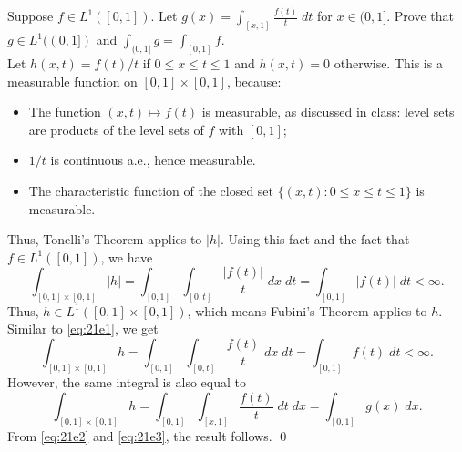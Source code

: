 \begin{hwsol}
Suppose $f \in L^1([0, 1])$. Let $g(x)= \int_{[x, 1]} \frac{f(t)}{t} \;dt$ for $x \in (0,1]$. Prove that $g \in L^1((0, 1])$ and $\int_{(0, 1]} g= \int_{[0, 1]} f$. \\

\pf Let $h(x,t)= f(t)/t$ if $0 \leq x \leq t \leq 1$ and $h(x,t)=0$ otherwise. This is a measurable function on $[0,1] \times [0,1]$, because: 
        \begin{itemize}
        \item The function $(x,t) \mapsto f(t)$ is measurable, as discussed in class: level sets are products of the level sets of $f$ with $[0,1]$;   
        \item $1/t$ is continuous a.e., hence measurable.
        \item The characteristic function of the closed set $\{ (x,t) \colon 0 \leq x \leq t \leq 1 \}$ is measurable.  
        \end{itemize}
Thus, Tonelli's Theorem applies to $|h|$. Using this fact and the fact that $f \in L^1([0,1])$, we have
        \begin{equation} \label{eq:21e1}
        \int_{[0, 1]\times [0, 1]} |h|= \int_{[0, 1]} \int_{[0, t]} \frac{|f(t)|}{t} \;dx \;dt = \int_{[0, 1]} |f(t)|  \;dt < \infty.
        \end{equation}
Thus, $h \in L^1([0, 1]\times [0, 1])$, which means Fubini's Theorem applies to $h$. Similar to \eqref{eq:21e1}, we get   
        \begin{equation}\label{eq:21e2}
        \int_{[0, 1]\times [0, 1]} h= \int_{[0, 1]} \int_{[0, t]} \frac{f(t)}{t} \;dx \;dt= \int_{[0, 1]} f(t)  \;dt < \infty.
        \end{equation}
However, the same integral is also equal to 
        \begin{equation}\label{eq:21e3}
        \int_{[0, 1]\times [0, 1]} h= \int_{[0, 1]} \int_{[x, 1]} \frac{f(t)}{t} \;dt \;dx= \int_{[0, 1]} g(x)  \;dx.
        \end{equation}
From \eqref{eq:21e2} and \eqref{eq:21e3}, the result follows. \qed \\
\end{hwsol}
 

